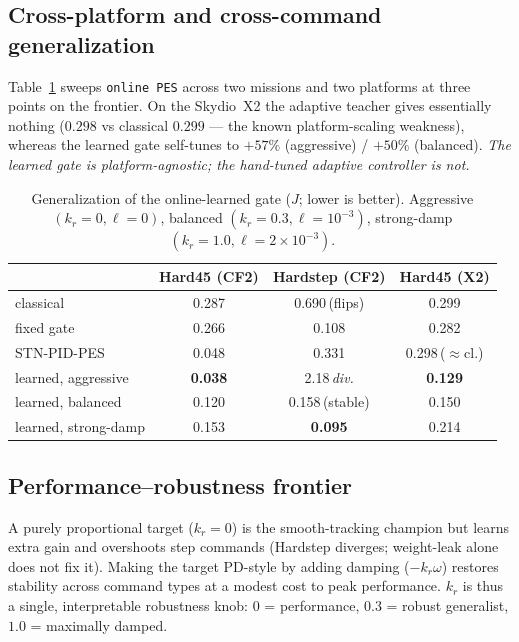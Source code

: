 \documentclass[conference]{IEEEtran}
\newcommand{\best}[1]{\textbf{#1}}
\begin{document}
\subsection{Cross-platform and cross-command generalization}
Table~\ref{tab:general} sweeps \texttt{online PES} across two missions and two
platforms at three points on the frontier. On the Skydio~X2 the adaptive teacher
gives essentially nothing ($0.298$ vs classical $0.299$ --- the known
platform-scaling weakness), whereas the learned gate self-tunes to
$+57\%$ (aggressive) / $+50\%$ (balanced). \emph{The learned gate is
platform-agnostic; the hand-tuned adaptive controller is not.}

\begin{table}[t]
\caption{Generalization of the online-learned gate ($J$; lower is better).
Aggressive $(k_r{=}0,\ell{=}0)$, balanced $(k_r{=}0.3,\ell{=}10^{-3})$,
strong-damp $(k_r{=}1.0,\ell{=}2{\times}10^{-3})$.}
\label{tab:general}
\centering\small
\begin{tabular}{@{}lccc@{}}
\toprule
 & Hard45 (CF2) & Hardstep (CF2) & Hard45 (X2) \\
\midrule
classical         & 0.287 & 0.690\,(flips) & 0.299 \\
fixed gate        & 0.266 & 0.108          & 0.282 \\
STN-PID-PES       & 0.048 & 0.331          & 0.298\,($\approx$cl.) \\
\midrule
learned, aggressive & \best{0.038} & 2.18\,\emph{div.} & \best{0.129} \\
learned, balanced   & 0.120 & 0.158\,(stable) & 0.150 \\
learned, strong-damp& 0.153 & \best{0.095}     & 0.214 \\
\bottomrule
\end{tabular}
\end{table}

\subsection{Performance--robustness frontier}\label{sec:frontier}
A purely proportional target ($k_r{=}0$) is the smooth-tracking champion but
learns extra gain and overshoots step commands (Hardstep diverges; weight-leak
alone does not fix it). Making the target PD-style by adding damping
($-k_r\omega$) restores stability across command types at a modest cost to peak
performance. $k_r$ is thus a single, interpretable robustness knob:
$0$ = performance, $0.3$ = robust generalist, $1.0$ = maximally damped.
\end{document}
